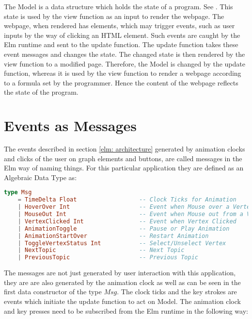 The Model is a data structure which holds the state of a program. See
\cite{Fairbank19}. This state is used by the view function as an input to
render the webpage.  The webpage, when rendered has elements, which may trigger
events, such as user inputs by the way of clicking an HTML element. Such events
are caught by the Elm runtime and sent to the update function.  The update
function takes these event messages and changes the state. The changed state is
then rendered by the view function to a modified page.  Therefore, the Model is
changed by the update function, whereas it is used by the view function to
render a webpage according to a formula set by the programmer. Hence the content
of the webpage reflects the state of the program.


\section{Events as Messages}
\label{impl: messages}
The events described in section \autoref{elm: architecture} generated by
animation clocks and clicks of the user on graph elements and buttons, are
called messages in the Elm way of naming things. For this particular
application they are defined as an Algebraic Data Type as:

\begin{lstlisting}[language=elm
                  , caption={
                              Abstract Data Type Msg with it's Data Constructors.
                              These messages are emanated from buttons, graph vertices
                              system clocks and are received by the update function
                              to change the $Model$, which carries the state of the
                              program.
                  }
                  ]
type Msg
    = TimeDelta Float                  -- Clock Ticks for Animation
    | HoverOver Int                    -- Event when Mouse over a Vertex                              
    | MouseOut Int                     -- Event when Mouse out from a Vertex                               
    | VertexClicked Int                -- Event when Vertex Clicked                              
    | AnimationToggle                  -- Pause or Play Animation
    | AnimationStartOver               -- Restart Animation
    | ToggleVertexStatus Int           -- Select/Unselect Vertex
    | NextTopic                        -- Next Topic
    | PreviousTopic                    -- Previous Topic
\end{lstlisting}
The messages are not just generated by user interaction with this application,
they are are also generated by the animation clock as well as can be seen in
the first data constructor of the type $Msg$.  The clock ticks and the key
strokes are events which initiate the update function to act on Model.  The
animation clock and key presses need to be subscribed from the Elm runtime in
the following way:


